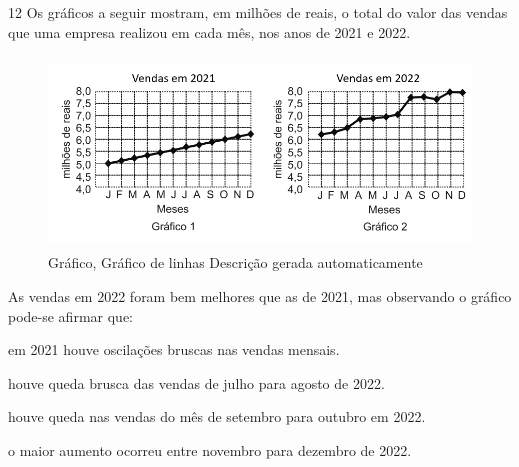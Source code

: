 \begin{escolha}
\begin{escolha}
\begin{escolha}
\begin{escolha}
{\begin{boxmedio}
\begin{boxpeq}
\begin{q°}
\begin{boxmedio}
\begin{boxpeq}
\begin{boxpeq}
\begin{boxmedio}
\begin{boxmedio}
\begin{boxmedio}
\begin{largebox}
\begin{boxmedio}
{\begin{escolha}
\begin{escolha}
\begin{escolha}
\begin{escolha}
\begin{escolha}
\begin{escolha}
\begin{escolha}
\end{escolha}


\num{12} Os gráficos a seguir mostram, em milhões de reais, o total do
valor das vendas que uma empresa realizou em cada mês, nos anos de 2021
e 2022.

\begin{figure}
\centering
\includegraphics[width=4.73437in,height=2.00699in]{./_SAEB_9_MAT/media/image269.png}
\caption{Gráfico, Gráfico de linhas Descrição gerada automaticamente}
\end{figure}

As vendas em 2022 foram bem melhores que as de 2021, mas observando o
gráfico pode-se afirmar que:

\begin{escolha}

  \item em 2021 houve oscilações bruscas nas vendas mensais.

  \item houve queda brusca das vendas de julho para agosto de 2022.

  \item houve queda nas vendas do mês de setembro para outubro em 2022.

  \item o maior aumento ocorreu entre novembro para dezembro de 2022.


\end{escolha}
\end{escolha}
\end{escolha}
\end{escolha}
\end{escolha}
\end{escolha}
\end{escolha}}
\end{boxmedio}
\end{largebox}
\end{boxmedio}
\end{boxmedio}
\end{boxmedio}
\end{boxpeq}
\end{boxpeq}
\end{boxmedio}
\end{q°}
\end{boxpeq}
\end{boxmedio}}
\end{escolha}
\end{escolha}
\end{escolha}
\end{escolha}
